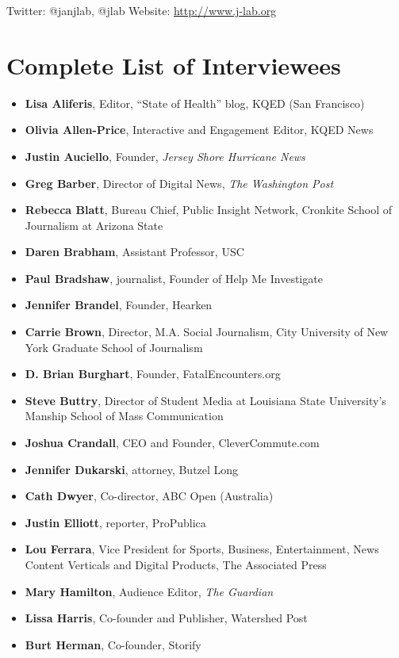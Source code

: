 \documentclass[notoc, symmetric, nobib, nols]{towcenter-guideto-book}
\begin{document}
Twitter: @janjlab, @jlab
Website: \href{http://www.j-lab.org }{http://www.j-lab.org} 


\section{Complete List of Interviewees} 

\begin{itemize}
\item \textbf{Lisa Aliferis}, Editor, ``State of Health'' blog, KQED (San Francisco)
\item \textbf{Olivia Allen-Price}, Interactive and Engagement Editor, KQED News
\item \textbf{Justin Auciello}, Founder, \textit{Jersey Shore Hurricane News}
\item \textbf{Greg Barber}, Director of Digital News, \textit{The Washington Post}
\item \textbf{Rebecca Blatt}, Bureau Chief, Public Insight Network, Cronkite School of Journalism at Arizona State
\item \textbf{Daren Brabham}, Assistant Professor, USC
\item \textbf{Paul Bradshaw}, journalist, Founder of Help Me Investigate
\item \textbf{Jennifer Brandel}, Founder, Hearken
\item \textbf{Carrie Brown}, Director, M.A. Social Journalism, City University of New York Graduate School of Journalism
\item \textbf{D. Brian Burghart}, Founder, FatalEncounters.org
\item \textbf{Steve Buttry}, Director of Student Media at Louisiana State University's Manship School of Mass Communication
\item \textbf{Joshua Crandall}, CEO and Founder, CleverCommute.com
\item \textbf{Jennifer Dukarski}, attorney, Butzel Long
\item \textbf{Cath Dwyer}, Co-director, ABC Open (Australia)
\item \textbf{Justin Elliott}, reporter, ProPublica
\item \textbf{Lou Ferrara}, Vice President for Sports, Business, Entertainment, News Content Verticals and Digital Products, The Associated Press
\item \textbf{Mary Hamilton}, Audience Editor, \textit{The Guardian}
\item \textbf{Lissa Harris}, Co-founder and Publisher, Watershed Post 
\item \textbf{Burt Herman}, Co-founder, Storify

\end{itemize}
\end{document}
